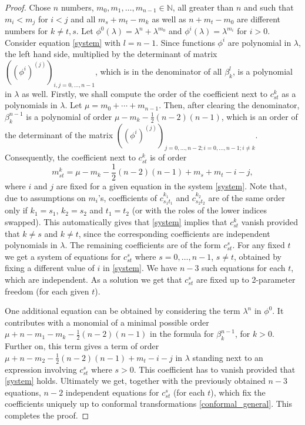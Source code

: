 \documentclass[11pt]{amsart}
\theoremstyle{definition}
\newcommand{\N}{\mathbb{N}}
\begin{document}
\begin{proof}
Chose $n$ numbers, $m_0,m_1,\ldots,m_{n-1}\in\N$, all greater than $n$ and such that $m_i<m_j$ for $i<j$ and all $m_s+m_t-m_k$ as well as $n+m_t-m_0$ are different numbers for $k\neq t,s$. Let $\phi^0(\lambda)=\lambda^n+\lambda^{m_0}$ and $\phi^i(\lambda)=\lambda^{m_{i}}$ for $i>0$. Consider equation \eqref{system} with $l=n-1$. Since functions $\phi^i$ are polynomial in $\lambda$, the left hand side, multiplied by the determinant of matrix $((\phi^i)^{(j)})_{i,j=0,\ldots,n-1}$, which is in the denominator of all $\beta^l_k$, is a polynomial in $\lambda$ as well. Firstly, we shall compute the order of the coefficient next to $c^k_{st}$ as a polynomials in $\lambda$. Let $\mu=m_0+\cdots+m_{n-1}$. Then, after clearing the denominator, $\beta^{n-1}_k$ is a polynomial of order $\mu-m_k-\frac{1}{2}(n-2)(n-1)$, which is an order of the determinant of the matrix $((\phi^i)^{(j)})_{j=0,\ldots,n-2; i=0,\ldots,n-1; i\neq k}$. Consequently, the coefficient next to $c^k_{st}$ is of order
\[
m^k_{st}=\mu-m_k-\frac{1}{2}(n-2)(n-1)+m_s+m_t-i-j,
\]
where $i$ and $j$ are fixed for a given equation in the system \eqref{system}. Note that, due to assumptions on $m_i$'s, coefficients of $c^{k_1}_{s_1t_1}$ and $c^{k_2}_{s_2t_2}$ are of the same order only if $k_1=s_1$, $k_2=s_2$ and $t_1=t_2$ (or with the roles of the lower indices swapped). This automatically gives that \eqref{system} implies that $c^k_{st}$ vanish provided that $k\neq s$ and $k\neq t$, since the corresponding coefficients are independent polynomials in $\lambda$. The remaining coefficients are of the form $c^s_{st}$. For any fixed $t$ we get a system of equations for $c^s_{st}$ where $s=0,\ldots,n-1$, $s\neq t$, obtained by fixing a different value of $i$ in \eqref{system}. We have $n-3$ such equations for each $t$, which are independent. As a solution we get that $c^s_{st}$ are fixed up to 2-parameter freedom (for each given $t$).

One additional equation can be obtained by considering the term $\lambda^n$ in $\phi^0$. It contributes with a monomial of a minimal possible order $\mu+n-m_1-m_k-\frac{1}{2}(n-2)(n-1)$ in the formula for $\beta^{n-1}_k$, for $k>0$. Further on, this term gives a term of order $\mu+n-m_2-\frac{1}{2}(n-2)(n-1)+m_t-i-j$ in $\lambda$ standing next to an expression involving $c^s_{st}$ where $s>0$. This coefficient has to vanish provided that \eqref{system} holds. Ultimately we get, together with the previously obtained $n-3$ equations, $n-2$ independent equations for $c^s_{st}$ (for each $t$), which fix the coefficients uniquely up to conformal transformations \eqref{conformal_general}. This completes the proof.
\end{proof}
\end{document}
